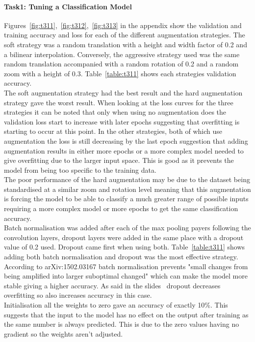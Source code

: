 \documentclass[10pt,twocolumn,letterpaper]{article}
\begin{document}
\paragraph{Task1: Tuning a Classification Model}
Figures~\ref{fig:t311},~\ref{fig:t312},~\ref{fig:t313} in the appendix show the validation and training accuracy and loss for each of the different augmentation strategies.
The soft strategy was a random translation with a height and width factor of 0.2 and a bilinear interpolation. Conversely, the aggressive strategy used was the same random translation accompanied with a random rotation of 0.2 and a random zoom with a height of 0.3. Table~\ref{table:t311} shows each strategies validation accuracy. \\
The soft augmentation strategy had the best result and the hard augmentation strategy gave the worst result. When looking at the loss curves for the three strategies it can be noted that only when using no augmentation does the validation loss start to increase with later epochs suggesting that overfitting is starting to occur at this point. In the other strategies, both of which use augmentation the loss is still decreasing by the last epoch suggestion that adding augmentation results in either more epochs or a more complex model needed to give overfitting due to the larger input space. This is good as it prevents the model from being too specific to the training data. \\
The poor performance of the hard augmentation may be due to the dataset being standardised at a similar zoom and rotation level meaning that this augmentation is forcing the model to be able to classify a much greater range of possible inputs requiring a more complex model or more epochs to get the same classification accuracy. \\
Batch normalisation was added after each of the max pooling payers following the convolution layers, dropout layers were added in the same place with a dropout value of 0.2 used. Dropout came first when using both. Table~\ref{table:t311} shows adding both batch normalisation and dropout was the most effective strategy. According to arXiv:1502.03167\cite{normalisation} batch normalisation prevents "small changes from being amplified into larger suboptimal changed" which can make the model more stable giving a higher accuracy. As said in the slides~\cite{slides3} dropout decreases overfitting so also increases accuracy in this case.
\\
Initialisation all the weights to zero gave an accuracy of exactly 10\%. This suggests that the input to the model has no effect on the output after training as the same number is always predicted. This is due to the zero values having no gradient so the weights aren't adjusted. 
\end{document}
